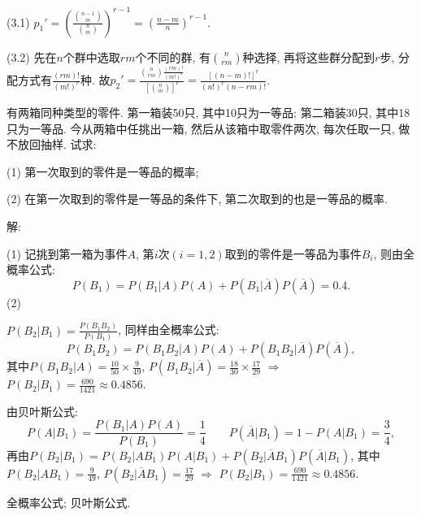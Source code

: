 \documentclass[standard]{ExBook}
\begin{document}
\begin{qitems}
\begin{bbox}
(3.1) $p_{1}'=(\frac{\binom{n-1}{m}}{\binom{n}{m}})^{r-1}=(\frac{n-m}{n})^{r-1}$.

(3.2) 先在$n$个群中选取$rm$个不同的群, 有$\binom{n}{rm}$种选择, 再将这些群分配到$r$步, 分配方式有$\frac{(rm)!}{(m!)^{r}}$种. 故$p_{2}'=\displaystyle\frac{\binom{n}{rm}\frac{(rm)!}{(m!)^{r}}}{[\binom{n}{m}]^{r}}=\frac{[(n-m)!]^{r}}{(n!)^r(n-rm)!}$.
    \end{bbox}

\vspace{-5em}

    \begin{bbox}
    \begin{shaded}
        \qitem
有两箱同种类型的零件. 第一箱装50只, 其中10只为一等品; 第二箱装30只, 其中18只为一等品. 今从两箱中任挑出一箱, 然后从该箱中取零件两次, 每次任取一只, 做不放回抽样. 试求:

(1) 第一次取到的零件是一等品的概率;

(2) 在第一次取到的零件是一等品的条件下, 第二次取到的也是一等品的概率.
    \end{shaded}
    \end{bbox}

\vspace{-5em}

    \begin{bbox}
解: 

(1) 记挑到第一箱为事件$A$, 第$i$次$(i=1,2)$取到的零件是一等品为事件$B_{i}$, 则由全概率公式:
$$P(B_{1})=P(B_{1}|A)P(A)+P(B_{1}|\overline{A})P(\overline{A})=0.4.$$
(2)

 $P(B_{2}|B_{1})=\frac{P(B_{1}B_{2})}{P(B_{1})}$, 同样由全概率公式:
$$P(B_{1}B_{2})=P(B_{1}B_{2}|A)P(A)+P(B_{1}B_{2}|\overline{A})P(\overline{A}),$$
其中$P(B_{1}B_{2}|A)=\frac{10}{50}\times\frac{9}{49}$, $P(B_{1}B_{2}|\overline{A})=\frac{18}{30}\times\frac{17}{29}$ $\Longrightarrow$ $P(B_{2}|B_{1})=\frac{690}{1421}\approx0.4856$.

 由贝叶斯公式:
$$P(A|B_{1})=\frac{P(B_{1}|A)P(A)}{P(B_{1})}=\frac{1}{4}\qquad P(\overline{A}|B_{1})=1-P(A|B_{1})=\frac{3}{4},$$
再由$P(B_{2}|B_{1})=P(B_{2}|AB_{1})P(A|B_{1})+P(B_{2}|\overline{A}B_{1})P(\overline{A}|B_{1})$, 其中$P(B_{2}|AB_{1})=\frac{9}{49}$, $P(B_{2}|\overline{A}B_{1})=\frac{17}{29}$ $\Longrightarrow$ $P(B_{2}|B_{1})=\frac{690}{1421}\approx0.4856$.

\textcolor{themeColor}{\selectfont {} 全概率公式; 贝叶斯公式.}
    \end{bbox}

\vspace{-5em}


\end{qitems}
\end{document}

